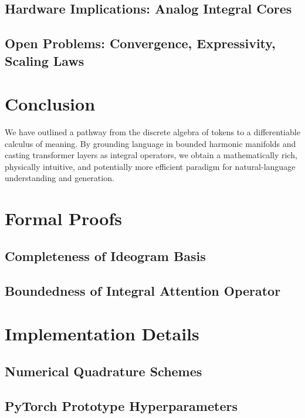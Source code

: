 \documentclass[11pt]{article}
\begin{document}
\subsection{Hardware Implications: Analog Integral Cores}
\subsection{Open Problems: Convergence, Expressivity, Scaling Laws}

\section{Conclusion}
\noindent
We have outlined a pathway from the discrete algebra of tokens to a
differentiable calculus of meaning.  By grounding language in bounded
harmonic manifolds and casting transformer layers as integral operators,
we obtain a mathematically rich, physically intuitive, and potentially
more efficient paradigm for natural-language understanding and
generation.


\appendix
\section{Formal Proofs}
\subsection{Completeness of Ideogram Basis}
\subsection{Boundedness of Integral Attention Operator}

\section{Implementation Details}
\subsection{Numerical Quadrature Schemes}
\subsection{PyTorch Prototype Hyperparameters}
\end{document}
